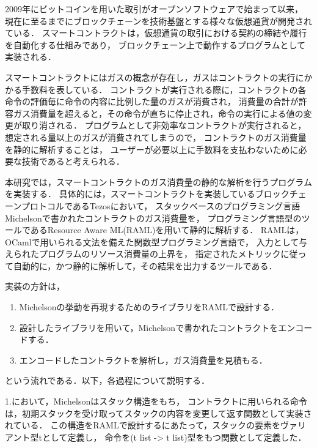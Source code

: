 \documentclass{kuisthesis}
\date{2021年2月2日}
\begin{document}
\maketitle

\begin{jabstract}
2009年にビットコインを用いた取引がオープンソフトウェアで始まって以来，
現在に至るまでにブロックチェーンを技術基盤とする様々な仮想通貨が開発されている．
スマートコントラクトは，仮想通貨の取引における契約の締結や履行を自動化する仕組みであり，
ブロックチェーン上で動作するプログラムとして実装される．

スマートコントラクトにはガスの概念が存在し，ガスはコントラクトの実行にかかる手数料を表している．
コントラクトが実行される際に，コントラクトの各命令の評価毎に命令の内容に比例した量のガスが消費され，
消費量の合計が許容ガス消費量を超えると，その命令が直ちに停止され，命令の実行による値の変更が取り消される．
プログラムとして非効率なコントラクトが実行されると，想定される量以上のガスが消費されてしまうので，
コントラクトのガス消費量を静的に解析することは，
ユーザーが必要以上に手数料を支払わないために必要な技術であると考えられる．

本研究では，スマートコントラクトのガス消費量の静的な解析を行うプログラムを実装する．
具体的には，スマートコントラクトを実装しているブロックチェーンプロトコルであるTezosにおいて，
スタックベースのプログラミング言語Michelsonで書かれたコントラクトのガス消費量を，
プログラミング言語型のツールであるResource Aware ML(RAML)を用いて静的に解析する．
RAMLは，OCamlで用いられる文法を備えた関数型プログラミング言語で，
入力として与えられたプログラムのリソース消費量の上界を，
指定されたメトリックに従って自動的に，かつ静的に解析して，その結果を出力するツールである．

実装の方針は，
\begin{enumerate}
  \item Michelsonの挙動を再現するためのライブラリをRAMLで設計する．
  \item 設計したライブラリを用いて，Michelsonで書かれたコントラクトをエンコードする．
  \item エンコードしたコントラクトを解析し，ガス消費量を見積もる．
\end{enumerate}
という流れである．以下，各過程について説明する．


1.において，Michelsonはスタック構造をもち，
コントラクトに用いられる命令は，初期スタックを受け取ってスタックの内容を変更して返す関数として実装されている．
この構造をRAMLで設計するにあたって，スタックの要素をヴァリアント型tとして定義し，
命令を(t list -> t list)型をもつ関数として定義した．


\end{jabstract}
\end{document}
